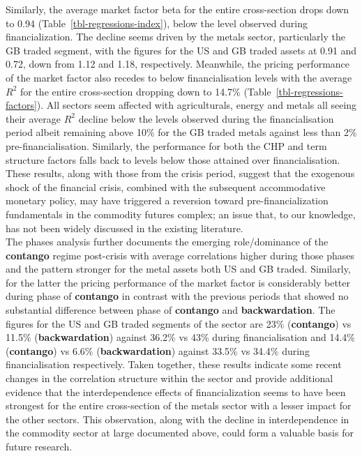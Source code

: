 \documentclass[
  authoryear,
  preprint,
  3p]{elsarticle}
\begin{document}
Similarly, the average market factor beta for the entire cross-section
drops down to 0.94 (Table~\ref{tbl-regressions-index}), below the level
observed during financialization. The decline seems driven by the metals
sector, particularly the GB traded segment, with the figures for the US
and GB traded assets at 0.91 and 0.72, down from 1.12 and 1.18,
respectively. Meanwhile, the pricing performance of the market factor
also recedes to below financialisation levels with the average \(R^{2}\)
for the entire cross-section dropping down to 14.7\%
(Table~\ref{tbl-regressions-factors}). All sectors seem affected with
agriculturals, energy and metals all seeing their average \(R^{2}\)
decline below the levels observed during the financialisation period
albeit remaining above 10\% for the GB traded metals against less than
2\% pre-financialisation. Similarly, the performance for both the CHP
and term structure factors falls back to levels below those attained
over financialisation. These results, along with those from the crisis
period, suggest that the exogenous shock of the financial crisis,
combined with the subsequent accommodative monetary policy, may have
triggered a reversion toward pre-financialization fundamentals in the
commodity futures complex; an issue that, to our knowledge, has not been
widely discussed in the existing literature.\\
The phases analysis further documents the emerging role/dominance of the
\textbf{contango} regime post-crisis with average correlations higher
during those phases and the pattern stronger for the metal assets both
US and GB traded. Similarly, for the latter the pricing performance of
the market factor is considerably better during phase of
\textbf{contango} in contrast with the previous periods that showed no
substantial difference between phase of \textbf{contango} and
\textbf{backwardation}. The figures for the US and GB traded segments of
the sector are 23\% (\textbf{contango}) vs 11.5\%
(\textbf{backwardation}) against 36.2\% vs 43\% during financialisation
and 14.4\% (\textbf{contango}) vs 6.6\% (\textbf{backwardation}) against
33.5\% vs 34.4\% during financialisation respectively. Taken together,
these results indicate some recent changes in the correlation structure
within the sector and provide additional evidence that the
interdependence effects of financialization seems to have been strongest
for the entire cross-section of the metals sector with a lesser impact
for the other sectors. This observation, along with the decline in
interdependence in the commodity sector at large documented above, could
form a valuable basis for future research.
\end{document}
